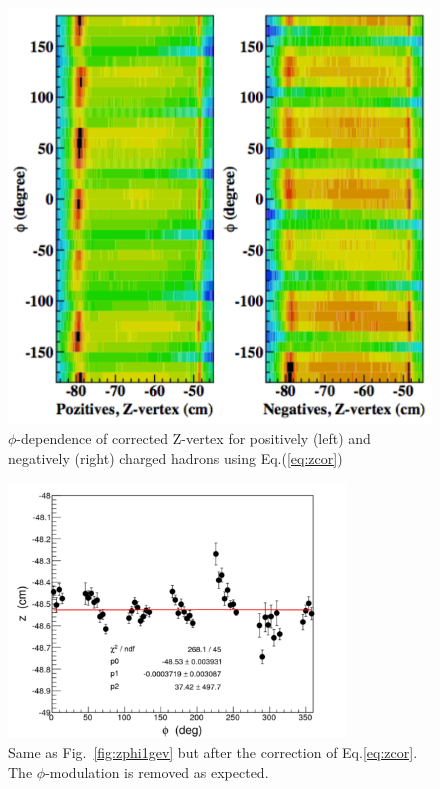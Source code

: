 \documentclass[12pt]{article}
\begin{document}
\begin{figure}[htbp]
\begin{center}
\includegraphics[width=.8\textwidth]{pos_neg_zvert}
\caption{$\phi$-dependence of corrected Z-vertex for positively (left) and negatively (right) charged hadrons using Eq.(\ref{eq:zcor})}
\label{fig:zcor_pn}
\end{center}
\end{figure}



\begin{figure}[htb]
\begin{center}
\includegraphics[width=0.8\textwidth]{zphicorr_1gev.png}
\caption{Same as Fig.~\ref{fig:zphi1gev} but after the correction of Eq.\ref{eq:zcor}.  The $\phi$-modulation is removed as expected.
\label{fig:zphi1gev_corr}}
\end{center}
\end{figure}
\end{document}
